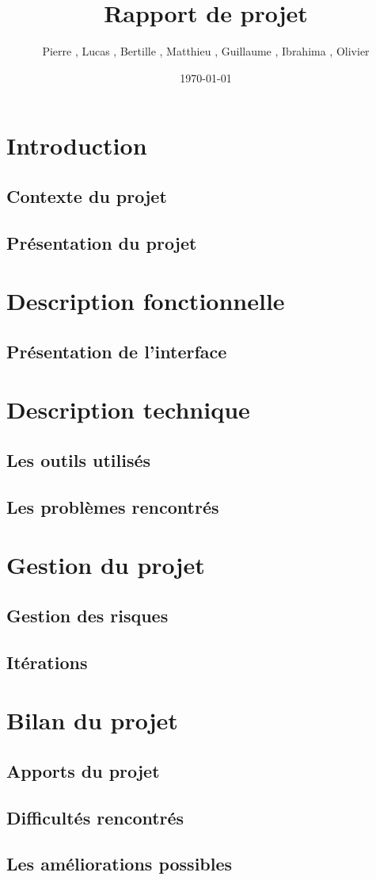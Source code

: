 \documentclass{../res/univ-projet}
\title{Rapport de projet}
\author{Pierre \bsc{Balmelle}, Lucas \bsc{Barbay}, Bertille \bsc{Bouillie}, Matthieu \bsc{Fin}, Guillaume \bsc{Leroy}, Ibrahima \bsc{Sorry Barry}, Olivier \bsc{Thibault}}
\date{\today}
\begin{document}
\maketitle
\newpage
\tableofcontents

\newpage

\section{Introduction}

\subsection{Contexte du projet}
\subsection{Présentation du projet}

\section{Description fonctionnelle}
\subsection{Présentation de l'interface}

\section{Description technique}
\subsection{Les outils utilisés}
\subsection{Les problèmes rencontrés}

\section{Gestion du projet}
\subsection{Gestion des risques}
\subsection{Itérations}

\section{Bilan du projet}
\subsection{Apports du projet}
\subsection{Difficultés rencontrés}
\subsection{Les améliorations possibles}
\end{document}
